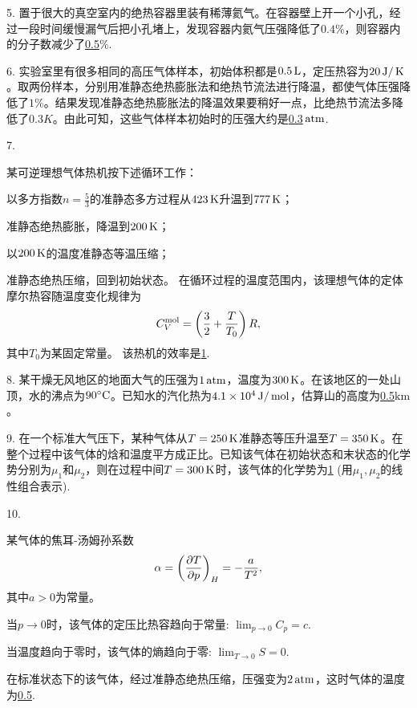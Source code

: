\documentclass[12pt,CJK]{article}
\begin{document}
\item[5.]{置于很大的真空室内的绝热容器里装有稀薄氦气。在容器壁上开一个小孔，经过一段时间缓慢漏气后把小孔堵上，发现容器内氦气压强降低了$0.4\%$，则容器内的分子数减少了\uline{0.5}\%. }

\item[6.]{实验室里有很多相同的高压气体样本，初始体积都是$0.5\,\mathrm{L}$，定压热容为$20\,\mathrm{J}/\,\mathrm{K}$。取两份样本，分别用准静态绝热膨胀法和绝热节流法进行降温，都使气体压强降低了$1\%$。结果发现准静态绝热膨胀法的降温效果要稍好一点，比绝热节流法多降低了$0.3K$。由此可知，这些气体样本初始时的压强大约是\uline{0.3}$\,\mathrm{atm}$.}  
  

\item[7.]{某可逆理想气体热机按下述循环工作：
      \bitem
    \item{以多方指数$n=\frac{5}{3}$的准静态多方过程从$423\,\mathrm{K}$升温到$777\,\mathrm{K}$；}
    \item{准静态绝热膨胀，降温到$200\,\mathrm{K}$；}
    \item{以$200\,\mathrm{K}$的温度准静态等温压缩；}
    \item{准静态绝热压缩，回到初始状态。}      
      \eitem
      在循环过程的温度范围内，该理想气体的定体摩尔热容随温度变化规律为
      $$C_V^{\rm mol} = \left(\frac{3}{2} + \frac{T}{T_0}\right)R,$$
      其中$T_0$为某固定常量。 该热机的效率是\uline{1}. }

\item[8.]{某干燥无风地区的地面大气的压强为$1\,\mathrm{atm}$，温度为$300\,\mathrm{K}$。在该地区的一处山顶，水的沸点为$90^\circ \mathrm{C}$。已知水的汽化热为$4.1\times 10^4\,\mathrm{J}/\,\mathrm{mol}$，估算山的高度为\uline{0.5}$\mathrm{km}$。 }  


\item[9.]{在一个标准大气压下，某种气体从$T=250\,\mathrm{K}$准静态等压升温至$T=350\,\mathrm{K}$。在整个过程中该气体的焓和温度平方成正比。已知该气体在初始状态和末状态的化学势分别为$\mu_1$和$\mu_2$，则在过程中间$T=300\,\mathrm{K}$时，该气体的化学势为\uline{1} (用$\mu_1,\mu_2$的线性组合表示). } 

\item[10.]{某气体的焦耳-汤姆孙系数
  $$\alpha = \left(\frac{\partial T}{\partial p}\right)_{H} =-\frac{a}{T^2},$$
  其中$a>0$为常量。
  
  当$p\rightarrow 0$时，该气体的定压比热容趋向于常量: $\lim_{p\rightarrow 0}C_p = c.$

  当温度趋向于零时，该气体的熵趋向于零: $ \lim_{T\rightarrow 0} S = 0.$
  
  在标准状态下的该气体，经过准静态绝热压缩，压强变为$2\,\mathrm{atm}$，这时气体的温度为\uline{0.5}. 
}
  \eitem  

\ech
\end{document}
